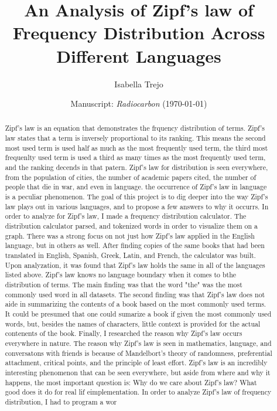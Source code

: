 \documentclass[a4paper,10pt]{article}
\title{An Analysis of Zipf's law of Frequency Distribution Across Different Languages}
\author{Isabella Trejo}
\date{\normalsize{Manuscript: \textit{Radiocarbon} (\today)}}
\begin{document}
\maketitle


\nocite{*}

\begin{abstract}
	Zipf's law is an equation that demonstrates the frquency distribution of terms. Zipf's law states that a term is inversely proportional to its ranking. This means the second most used term is used half as much as the most frequently used term, the third most frequenlty used term is used a third as many times as the most frequently used term, and the ranking decends in that patern. Zipf's law for distribution is seen everywhere, from the population of cities, the number of academic papers cited, the number of people that die in war, and even in language. the occurrence of Zipf's law in language is a peculiar phenomenon. The goal of this project is to dig deeper into the way Zipf's law plays out in various languages, and to propose a few answers to why it occurrs. In order to analyze for Zipf's law, I made a frequency distribution calculator. The distribution calculator parsed, and tokenized words in order to visualize them on a graph. There was a strong focus on not just how Zipf's law applied in the English language, but in others as well. After finding copies of the same books that had been translated in English, Spanish, Greek, Latin, and French, the calculator was built. Upon analyzation, it was found that Zipf's law holds the same in all of the languages listed above. Zipf's law knows no language boundary when it comes to bthe distribution of terms. The main finding was that the word "the" was the most commonly used word in all datasets. The second finding was that Zipf's law does not aide in summarizing the contents of a book based on the most commonly used terms. It could be presumed that one could sumarize a book if given the most commonly used words, but, besides the names of characters, little context is provided for the actual contenents of the book. Finally, I researched the reason why Zipf's law occurs everywhere in nature. The reason why Zipf's law is seen in mathematics, language, and conversatons with friends is because of Mandelbort's theory of randomness, preferential attachment, critical points, and the principle of least effort. Zipf's law is an incredibly interesting phenomenon that can be seen everywhere, but aside from where and why it happens, the most important question is: Why do we care about Zipf's law? What good does it do for real lif eimplementation.  In order to analyze Zipf’s law of frequency distribution, I had to program a wor
\end{abstract}
\end{document}
